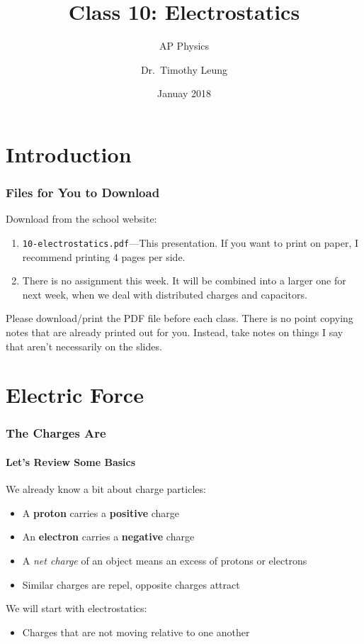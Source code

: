 \documentclass[12pt,aspectratio=169]{beamer}
\title{Class 10: Electrostatics}
\subtitle{AP Physics}
\author[TML]{Dr.\ Timothy Leung}
\institute{Olympiads School}
\date{Januay 2018}
\newcommand{\mb}[1]{\mathbf{#1}}
\begin{document}
\begin{frame}
  \maketitle
\end{frame}


\section[Intro]{Introduction}

\begin{frame}
  \frametitle{Files for You to Download}
  Download from the school website:
  \begin{enumerate}
  \item\texttt{10-electrostatics.pdf}---This presentation. If you want to print
    on paper, I recommend printing 4 pages per side.

  \item There is no assignment this week. It will be combined into a larger one
    for next week, when we deal with distributed charges and capacitors.
  \end{enumerate}
  
  Please download/print the PDF file before each class. There is no point
  copying notes that are already printed out for you. Instead, take notes on
  things I say that aren't necessarily on the slides.
\end{frame}


\section[$\mb{F}_q$]{Electric Force}

\begin{frame}
  \frametitle{The Charges Are}
  \framesubtitle{Let's Review Some Basics}
  We already know a bit about charge particles:
  \begin{itemize}
  \item A \textbf{proton} carries a \textbf{positive} charge
  \item An \textbf{electron} carries a \textbf{negative} charge
  \item A \emph{net charge} of an object means an excess of protons or electrons
  \item Similar charges are repel, opposite charges attract
  \end{itemize}

  \vspace{0.2in}
  We will start with electrostatics:
  \begin{itemize}
  \item Charges that are not moving relative to one another
  \end{itemize}
\end{frame}
\end{document}
